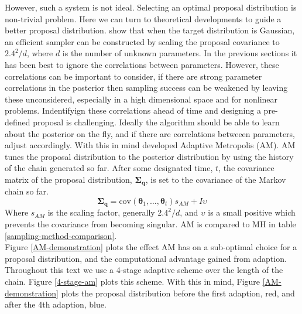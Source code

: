 However, such a system is not ideal. Selecting an optimal proposal distribution is non-trivial problem. Here we can turn to theoretical developments to guide a better proposal distribution. \citet{Gelman1996} show that when the target distribution is Gaussian, an efficient sampler can be constructed by scaling the proposal covariance to $2.4^2/d$, where $d$ is the number of unknown parameters. In the previous sections it has been best to ignore the correlations between parameters. However, these correlations can be important to consider, if there are strong parameter correlations in the posterior then sampling success can be weakened by leaving these unconsidered, especially in a high dimensional space and for nonlinear problems. Indentifyign these correlations ahead of time and designing a pre-defined proposal is challenging. Ideally the algorithm should be able to learn about the posterior on the fly, and if there are correlations betweeen parameters, adjust accordingly. With this in mind \citet{haario2001} developed Adaptive Metropolis (AM). AM tunes the proposal distribution to the posterior distribution by using the history of the chain generated so far. After some designated time, $t$, the covariance matrix of the proposal distribution, $\bm{\Sigma_q}$, is set to the covariance of the Markov chain so far. 
\begin{equation}
\bm{\Sigma_q} = \text{cov}(\bm{\theta}_1,\dots,\bm{\theta}_t)s_{AM} + I\upsilon
\end{equation}
Where $s_{AM}$ is the scaling factor, generally $2.4^2/d$, and $\upsilon$ is a small positive which prevents the covariance from becoming singular. AM is compared to MH in table \ref{sampling-method-comparison}.\\

Figure \ref{AM-demonstration} plots the effect AM has on a sub-optimal choice for a proposal distribution, and the computational advantage gained from adaption. \\

Throughout this text we use a 4-stage adaptive scheme over the length of the chain. Figure \ref{4-stage-am} plots this scheme. With this in mind, Figure \ref{AM-demonstration} plots the proposal distribution before the first adaption, red, and after the 4th adaption, blue. \\
\linebreak
\linebreak
\linebreak


